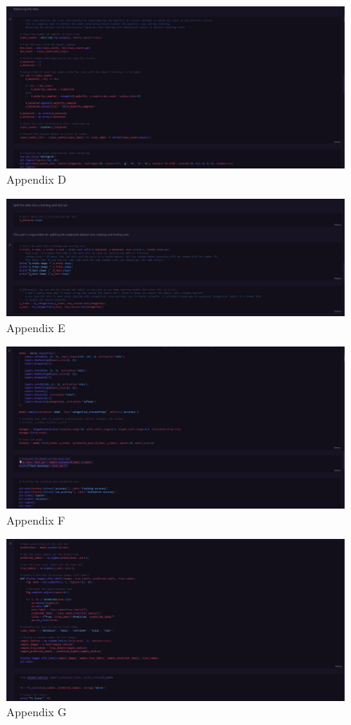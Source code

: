 \begin{figure}[h]
    \centering
    \includegraphics[width=0.8\linewidth]{cells image 4.jpg}
    \caption{Appendix D}
    \label{fig:appendix_image}
\end{figure}


\begin{figure}[h]
    \centering
    \includegraphics[width=0.8\linewidth]{cells image 5.jpg}
    \caption{Appendix E}
    \label{fig:appendix_image}
\end{figure}


\begin{figure}[h]
    \centering
    \includegraphics[width=0.8\linewidth]{cells image 6.jpg}
    \caption{Appendix F}
    \label{fig:appendix_image}
\end{figure}


\begin{figure}[h]
    \centering
    \includegraphics[width=0.8\linewidth]{cells image 7.jpg}
    \caption{Appendix G}
    \label{fig:appendix_image}
\end{figure}
